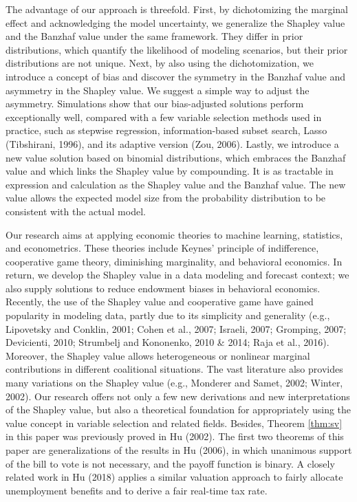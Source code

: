 \documentclass[a4paper,12pt]{article}
\begin{document}
The advantage of our approach is threefold. First, 
by dichotomizing the marginal effect and acknowledging the model uncertainty, we generalize the
Shapley value and the Banzhaf value under the same framework. 
They differ in prior distributions, which quantify the likelihood of modeling scenarios, but
their prior distributions are not unique.
Next, by  also using the dichotomization, we introduce a concept of bias and discover the symmetry in the Banzhaf value and asymmetry in the Shapley value. We
suggest a simple way to adjust the asymmetry. 
Simulations show that our bias-adjusted solutions perform exceptionally well, compared with a few variable selection methods used in practice, such as
stepwise regression, information-based subset search, Lasso (Tibshirani, 1996), and its adaptive version (Zou, 2006).
Lastly, we introduce a new value solution based on binomial distributions,
which embraces the Banzhaf value and which links the Shapley value by compounding.
It is as tractable in expression and calculation as the Shapley value and the Banzhaf value. 
The new value allows the expected model size from the probability distribution to be consistent with the actual model.

Our research aims at applying economic theories to machine learning, statistics, and econometrics.
These theories include Keynes' principle of indifference, cooperative game theory, diminishing marginality, and behavioral economics.
In return, we develop the Shapley value in a data modeling and forecast context; we also supply solutions to reduce endowment biases in behavioral economics.
Recently, the use of the Shapley value and cooperative game have gained popularity in modeling data, partly due to its simplicity and generality
(e.g.,  Lipovetsky and Conklin, 2001; Cohen et al., 2007; Israeli, 2007; Gromping, 2007; Devicienti, 2010; Strumbelj and Kononenko, 2010 \& 2014; Raja et al., 2016). 
Moreover, the Shapley value allows heterogeneous or nonlinear marginal contributions in different coalitional situations.
The vast literature also provides many variations on the Shapley value (e.g., Monderer and Samet, 2002; Winter, 2002).
Our research offers not only a few new derivations and new interpretations of the Shapley value, but also
a theoretical foundation for appropriately using the value concept in variable selection and related fields.
Besides, Theorem \ref{thm:sv} in this paper was previously proved in Hu (2002).
The first two theorems of this paper are generalizations of the results in Hu (2006), in which unanimous support of the bill to vote is not necessary, and the payoff function is binary. 
A closely related work in Hu (2018) applies a similar valuation approach to fairly allocate unemployment benefits and to derive a fair real-time tax rate.
\end{document}
